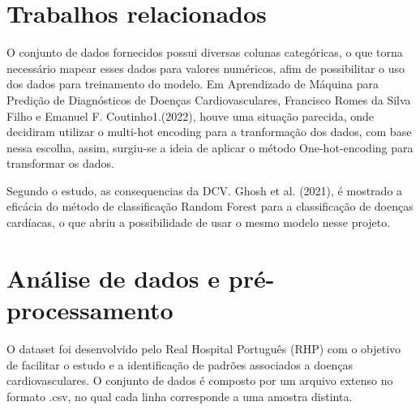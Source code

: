\documentclass[10pt, conference, compsocconf]{IEEEtran}
\begin{document}
\section{Trabalhos relacionados}
O conjunto de dados fornecidos possui diversas colunas categóricas, o que torna necessário mapear esses dados para valores numéricos, afim de 
possibilitar o uso dos dados para treinamento do modelo. Em Aprendizado de Máquina para Predição de Diagnósticos de Doenças Cardiovasculares,
Francisco Romes da Silva Filho e Emanuel F. Coutinho1.(2022), houve uma situação parecida, onde decidiram utilizar o multi-hot encoding para a tranformação
dos dados, com base nessa escolha, assim, surgiu-se a ideia de aplicar o método One-hot-encoding para transformar os dados.

Segundo o estudo, as consequencias da DCV. Ghosh et al. (2021), é mostrado a eficácia do método de classificação Random Forest
para a classificação de doenças cardíacas, o que abriu a possibilidade de usar o mesmo modelo nesse projeto.

\vspace{1cm}

\section{Análise de dados e pré-processamento}
O dataset foi desenvolvido pelo Real Hospital Português (RHP) com o objetivo de facilitar o estudo e a identificação de padrões 
associados a doenças cardiovasculares. O conjunto de dados é composto por um arquivo extenso no formato .csv, no qual cada 
linha corresponde a uma amostra distinta.
\end{document}
